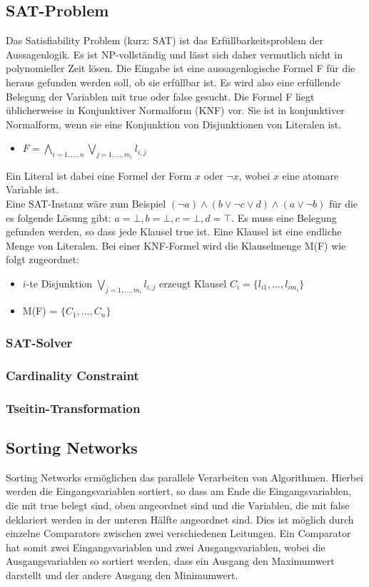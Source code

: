 \documentclass[a4,abstract=on]{scrartcl}
\begin{document}
\subsection{SAT-Problem}
Das Satisfiability Problem (kurz: SAT) ist das Erfüllbarkeitsproblem der Aussagenlogik. Es ist NP-vollständig und lässt sich daher vermutlich nicht in polynomieller Zeit lösen. Die Eingabe ist eine aussagenlogische Formel F für die heraus gefunden werden soll, ob sie erfüllbar ist. Es wird also eine erfüllende Belegung der Variablen mit true oder false gesucht. Die Formel F liegt üblicherweise in Konjunktiver Normalform (KNF) vor. Sie ist in konjunktiver Normalform, wenn sie eine Konjunktion von Disjunktionen von Literalen ist.\\
\begin{itemize}
\item $F = \bigwedge_{i=1, \dots ,n} \bigvee_{j=1,\dots ,m_i}{l_{i,j}}$\\
\end{itemize}
Ein Literal ist dabei eine Formel der Form $x$ oder $\neg x$, wobei $x$ eine atomare Variable ist.\\
Eine SAT-Instanz wäre zum Beispiel $(\neg a) \wedge (b \vee \neg c \vee d) \wedge (a \vee \neg b)$  für die es folgende Lösung gibt: $a = \bot, b = \bot, c= \bot, d = \top$. Es muss eine Belegung gefunden werden, so dass jede Klausel true ist.
Eine Klausel ist eine endliche Menge von Literalen. Bei einer KNF-Formel wird die Klauselmenge M(F) wie folgt zugeordnet:\\
\begin{itemize}
\item $i$-te Disjunktion $\bigvee_{j=1,\dots ,m_i}{l_{i,j}}$ erzeugt Klausel $C_i = \{l_{i1}, \dots, l_{im_i}\}$
\item M(F) = $\{C_1, \dots, C_n\}$
\end{itemize}
\subsubsection{SAT-Solver}
\subsubsection{Cardinality Constraint}
\subsubsection{Tseitin-Transformation}
\subsection{Sorting Networks}
Sorting Networks ermöglichen das parallele Verarbeiten von Algorithmen. Hierbei werden die Eingangsvariablen sortiert, so dass am Ende die Eingangsvariablen, die mit true belegt sind, oben angeordnet sind und die Variablen, die mit false deklariert werden in der unteren Hälfte angeordnet sind. Dies ist möglich durch einzelne Comparators zwischen zwei verschiedenen Leitungen. Ein Comparator hat somit zwei Eingangsvariablen und zwei Ausgangsvariablen, wobei die Ausgangsvariablen so sortiert werden, dass ein Ausgang den Maximumwert darstellt und der andere Ausgang den Minimumwert. 
\end{document}
